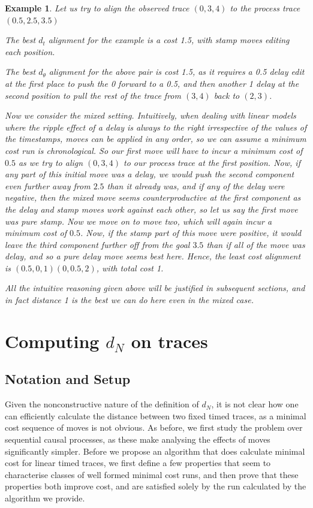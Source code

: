 \documentclass[conference]{IEEEtran}
\newtheorem{example}{Example}
\begin{document}
	
	\begin{example}\label{stamptoy}
		Let us try to align the observed trace $(0, 3, 4)$ to the process trace $(0.5, 2.5, 3.5)$
		
		The best $d_t$ alignment for the example is a cost 1.5, with stamp moves editing each position. 
		
		The best $d_\theta$ alignment for the above pair is cost 1.5, as it requires a 0.5 delay edit at the first place to push the 0 forward to a 0.5, and then another 1 delay at the second position to pull the rest of the trace from $(3,4)$ back to $(2,3)$. 
		
		Now we consider the mixed setting. 
		Intuitively, when dealing with linear models where the ripple effect of a delay is always to the right irrespective of the values of the timestamps, moves can be applied in any order, so we can assume a minimum cost run is chronological. 
		So our first move will have to incur a minimum cost of $0.5$ as we try to align $(0,3,4)$ to our process trace at the first position.
		Now, if any part of this initial move was a delay, we would push the second component even further away from $2.5$ than it already was, and if any of the delay were negative, then the mixed move seems counterproductive at the first component as the delay and stamp moves work against each other, so let us say the first move was pure stamp. 
		Now we move on to move two, which will again incur a minimum cost of $0.5$. 
		Now, if the stamp part of this move were positive, it would leave the third component further off from the goal $3.5$ than if all of the move was delay, and so a pure delay move seems best here. 
		Hence, the least cost alignment is $(0.5, 0, 1)(0, 0.5, 2)$, with total cost 1. 
		
		All the intuitive reasoning given above will be justified in subsequent sections, and in fact distance 1 is the best we can do here even in the mixed case. 
	\end{example}
	

	\section{Computing $d_N$ on traces}\label{3}
	\subsection{Notation and Setup}
	Given the nonconstructive nature of the definition of $d_N$, it is not clear how one can efficiently calculate the distance between two fixed timed traces, as a minimal cost sequence of moves is not obvious. 
	As before, we first study the problem over sequential causal processes, as these make analysing the effects of moves significantly simpler. 
	Before we propose an algorithm that does calculate minimal cost for linear timed traces, we first define a few properties that seem to characterise classes of well formed minimal cost runs, and then prove that these properties both improve cost, and are satisfied solely by the run calculated by the algorithm we provide. 
	
\end{document}
